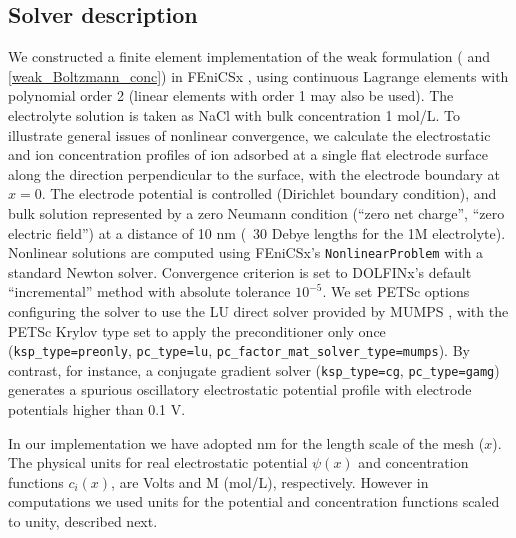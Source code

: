 \subsection{Solver description}
We constructed a finite element implementation of the weak
formulation ( and \eqref{weak_Boltzmann_conc}) in
FEniCSx \citep{baratta2023dolfinx}, using continuous
Lagrange elements with polynomial order 2 (linear elements with order
1 may also be used).  The electrolyte solution
is taken as NaCl with bulk concentration 1 mol/L.  To illustrate
general issues of nonlinear convergence, we calculate the
electrostatic and ion concentration profiles of ion adsorbed at a
single flat electrode surface along the direction perpendicular to the
surface, with the electrode boundary at $x=0$.  The electrode
potential is controlled (Dirichlet boundary condition), and bulk
solution represented by a zero Neumann condition (``zero net charge'', ``zero electric
field'') at  a distance of 10 nm (~30 Debye lengths for the 1M
electrolyte). Nonlinear solutions are computed using FEniCSx's
\texttt{NonlinearProblem} with a standard Newton solver. Convergence criterion
is set to DOLFINx's default ``incremental'' method with absolute
tolerance $10^{-5}$.
We set PETSc options \citep{PETSc_manual,petsc4py_2011} configuring the solver to use the LU direct
solver provided by MUMPS \citep{MUMPS_2001,MUMPS_2019}, with the PETSc Krylov type set to apply the
preconditioner only once (\verb|ksp_type=preonly|, \verb|pc_type=lu|,  \verb|pc_factor_mat_solver_type=mumps|).
By contrast, for instance, a
conjugate gradient solver (\verb|ksp_type=cg|, \verb|pc_type=gamg|)
generates a spurious oscillatory electrostatic potential profile with electrode
potentials higher than 0.1 V.

In our implementation we have adopted nm for the length scale of the
mesh ($x$). The physical units for real  electrostatic potential
$\psi(x)$ and concentration functions  $c_{i}(x)$, are Volts and M
(mol/L), respectively. However in computations we used units for the
potential and concentration functions scaled to unity, described next.

